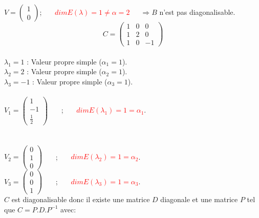 \documentclass[a4paper,12pt,french]{article}
\begin{document}
$V=\begin{pmatrix}
	1 \\
	0  
	
\end{pmatrix}$;~~~ \textcolor{red}{$dim E(\lambda)=1\ne \alpha=2$}~~~$\Rightarrow B$ n'est pas diagonalisable.
\[ C=\begin{pmatrix}
 	1 & 0 & 0  \\
 	1 & 2 & 0\\
 	1 & 0 & -1
 	
 \end{pmatrix}
\]
~~~ \\
$\lambda_{1}=1$ : Valeur propre simple ($\alpha_{1}=1$).\\
$\lambda_{2}=2$ : Valeur propre simple ($\alpha_{2}=1$).\\
$\lambda_{3}=-1$ : Valeur propre simple ($\alpha_{3}=1$).\\~~~ \\
$V_{1}=\begin{pmatrix}
	1  \\
	-1  \\
	\frac{1}{2}
	
\end{pmatrix}$ ~~~;~~~ \textcolor{red}{$dim E(\lambda_{1})=1=\alpha_{1}$}.\\
~~~ \\
~~~ \\
$V_{2}=\begin{pmatrix}
	0  \\
	1  \\
	0
	
\end{pmatrix}$ ~~~;~~~ \textcolor{red}{$dim E(\lambda_{2})=1=\alpha_{2}$}.\\
$V_{3}=\begin{pmatrix}
	0  \\
	0  \\
	1
	
\end{pmatrix}$ ~~~;~~~ \textcolor{red}{$dim E(\lambda_{3})=1=\alpha_{3}$}.\\

$C$ est diagonalisable donc il existe une matrice $D$ diagonale et une matrice $P$ tel que $C=P.D.P^{-1}$ avec:\\
\end{document}

